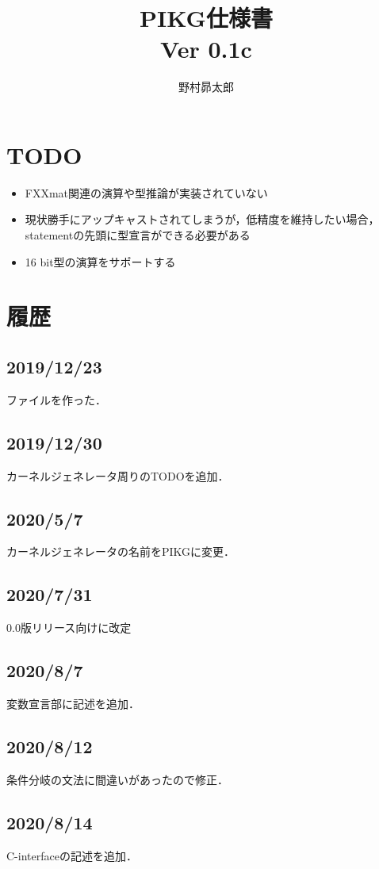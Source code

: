 \documentclass{article}
\begin{document}
%
\title{PIKG仕様書\\
{\large 
Ver 0.1c\\
}
}
\author{野村昴太郎}
\maketitle
\thispagestyle{empty}

\newpage
\tableofcontents
\newpage

\section{TODO}
 \begin{itemize}
  \item FXXmat関連の演算や型推論が実装されていない
  \item 現状勝手にアップキャストされてしまうが，低精度を維持したい場合，statementの先頭に型宣言ができる必要がある
  \item 16 bit型の演算をサポートする
 \end{itemize}
\section{履歴}
\label{sect:4}
\subsection{2019/12/23}
ファイルを作った．
\subsection{2019/12/30}
カーネルジェネレータ周りのTODOを追加．
\subsection{2020/5/7}
カーネルジェネレータの名前をPIKGに変更．
\subsection{2020/7/31}
0.0版リリース向けに改定
\subsection{2020/8/7}
変数宣言部に記述を追加．
\subsection{2020/8/12}
条件分岐の文法に間違いがあったので修正．
\subsection{2020/8/14}
C-interfaceの記述を追加．
\end{document}

